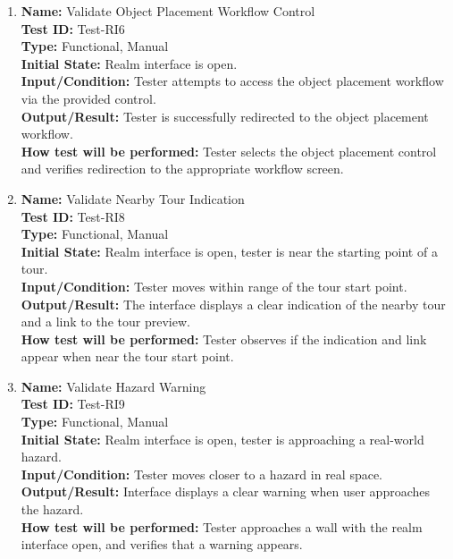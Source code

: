 \documentclass[12pt, titlepage]{article}
\begin{document}
\begin{enumerate}
  \item \textbf{Name:} Validate Object Placement Workflow Control \label{itm:Test-RI6} \\
        \textbf{Test ID:} Test-RI6 \\
        \textbf{Type:} Functional, Manual \\
        \textbf{Initial State:} Realm interface is open. \\
        \textbf{Input/Condition:} Tester attempts to access the object placement workflow via the provided control. \\
        \textbf{Output/Result:} Tester is successfully redirected to the object placement workflow. \\
        \textbf{How test will be performed:} Tester selects the object placement control and verifies redirection to the appropriate workflow screen.

  \item \textbf{Name:} Validate Nearby Tour Indication \label{itm:Test-RI8} \\
        \textbf{Test ID:} Test-RI8 \\
        \textbf{Type:} Functional, Manual \\
        \textbf{Initial State:} Realm interface is open, tester is near the starting point of a tour. \\
        \textbf{Input/Condition:} Tester moves within range of the tour start point. \\
        \textbf{Output/Result:} The interface displays a clear indication of the nearby tour and a link to the tour preview. \\
        \textbf{How test will be performed:} Tester observes if the indication and link appear when near the tour start point.

  \item \textbf{Name:} Validate Hazard Warning \label{itm:Test-RI9} \\
        \textbf{Test ID:} Test-RI9 \\
        \textbf{Type:} Functional, Manual \\
        \textbf{Initial State:} Realm interface is open, tester is approaching a real-world hazard. \\
        \textbf{Input/Condition:} Tester moves closer to a hazard in real space. \\
        \textbf{Output/Result:} Interface displays a clear warning when user approaches the hazard. \\
        \textbf{How test will be performed:} Tester approaches a wall with the realm interface open, and verifies that a warning appears.


\end{enumerate}
\end{document}
